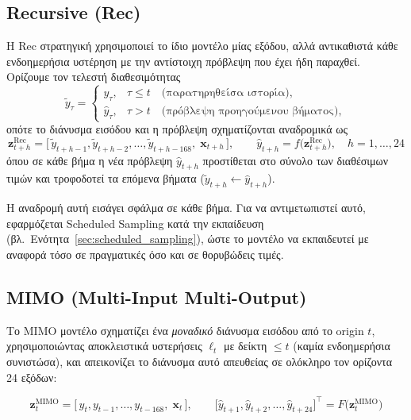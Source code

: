 \subsection{Recursive (Rec)}

Η Rec στρατηγική χρησιμοποιεί το ίδιο μοντέλο μίας εξόδου, αλλά αντικαθιστά κάθε
ενδοημερήσια υστέρηση με την αντίστοιχη πρόβλεψη που έχει ήδη παραχθεί. Ορίζουμε τον
τελεστή διαθεσιμότητας
\begin{equation}
  \tilde{y}_\tau =
  \begin{cases}
    y_\tau, & \tau \le t \quad \text{(παρατηρηθείσα ιστορία)},\\[2pt]
    \hat{y}_\tau, & \tau > t \quad \text{(πρόβλεψη προηγούμενου βήματος)},
  \end{cases}
  \label{eq:rec_availability}
\end{equation}
οπότε το διάνυσμα εισόδου και η πρόβλεψη σχηματίζονται αναδρομικά ως
\begin{equation}
  \mathbf{z}^{\mathrm{Rec}}_{t+h} = \big[\,\tilde{y}_{t+h-1}, \tilde{y}_{t+h-2}, \ldots,
  \tilde{y}_{t+h-168},\; \mathbf{x}_{t+h}\,\big], \qquad
  \hat{y}_{t+h} = f\!\big(\mathbf{z}^{\mathrm{Rec}}_{t+h}\big),
  \quad h = 1, \ldots, 24
  \label{eq:recursive_methods}
\end{equation}
όπου σε κάθε βήμα η νέα πρόβλεψη $\hat{y}_{t+h}$ προστίθεται στο σύνολο των διαθέσιμων
τιμών και τροφοδοτεί τα επόμενα βήματα ($\tilde{y}_{t+h} \leftarrow \hat{y}_{t+h}$).

Η αναδρομή αυτή εισάγει σφάλμα σε κάθε βήμα. Για να αντιμετωπιστεί αυτό, εφαρμόζεται
Scheduled Sampling κατά την εκπαίδευση (βλ.\ Ενότητα~\ref{sec:scheduled_sampling}),
ώστε το μοντέλο να εκπαιδευτεί με αναφορά τόσο σε πραγματικές όσο και σε θορυβώδεις
τιμές.


\subsection{MIMO (Multi-Input Multi-Output)}

Το MIMO μοντέλο σχηματίζει ένα \emph{μοναδικό} διάνυσμα εισόδου από το origin $t$,
χρησιμοποιώντας αποκλειστικά υστερήσεις $\boldsymbol{\ell}_t$ με δείκτη $\le t$ (καμία
ενδοημερήσια συνιστώσα), και απεικονίζει το διάνυσμα αυτό απευθείας σε ολόκληρο τον
ορίζοντα 24 εξόδων:

\begin{equation}
  \mathbf{z}^{\mathrm{MIMO}}_{t} = \big[\,y_{t}, y_{t-1}, \ldots, y_{t-168},\;
  \mathbf{x}_{t}\,\big], \qquad
  \big[\hat{y}_{t+1}, \hat{y}_{t+2}, \ldots, \hat{y}_{t+24}\big]^{\!\top}
  = F\!\big(\mathbf{z}^{\mathrm{MIMO}}_{t}\big)
  \label{eq:mimo_methods}
\end{equation}


